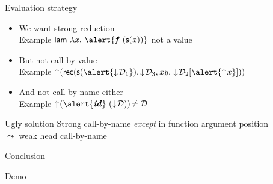 \begin{frame}{Evaluation strategy}
  \begin{itemize}[<+->]
  \item We want strong reduction\\
    \textcolor{greenish}{Example}\quad
    $\cst{lam}\ \lam x \alert{\fct{f}\ (\s {\var x})} $
    {\footnotesize not a value}
  \item But not call-by-value\\
    \textcolor{greenish}{Example}\quad
    $\finfer{(\recb{\s{\alert{\fget\md_1}}}{\fget\md_3} x y {\fget{\md_2[\alert{\finfer{x}}]}})}$
  \item And not call-by-name either \\
    \textcolor{greenish}{Example}\quad
    $\finfer{(\alert{\fct{id}}\ (\fget{\md}))}${\footnotesize$\neq\mathcal D$}
  \end{itemize}
  \pause
  \begin{block}{Ugly solution}
    Strong call-by-name \emph{except} in function argument position\\
    \qquad$\leadsto$ weak head call-by-name
  \end{block}
\end{frame}

\begin{frame}{Conclusion}
  \begin{center}
    \huge Demo
  \end{center}
\end{frame}

